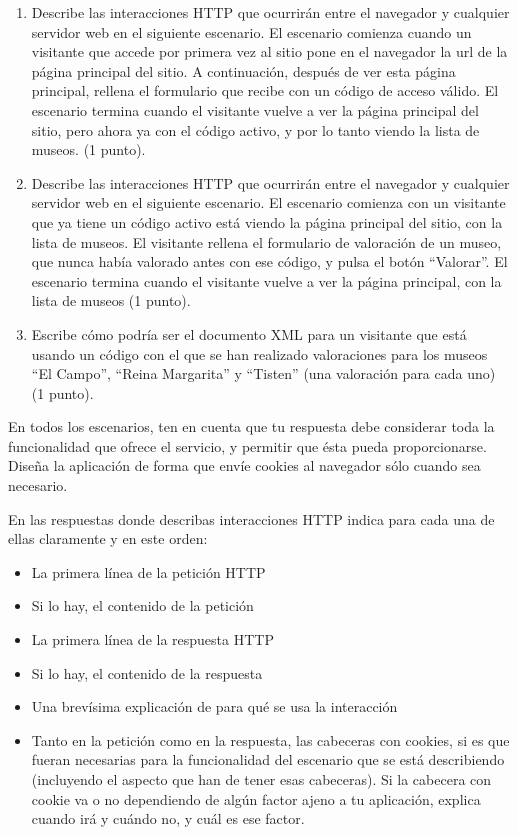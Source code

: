 {\begin{enumerate}
\item Describe las interacciones HTTP que ocurrirán entre el navegador y cualquier servidor web en el siguiente escenario. El escenario comienza cuando un visitante que accede por primera vez al sitio pone en el navegador la url de la página principal del sitio. A continuación, después de ver esta página principal, rellena el formulario que recibe con un código de acceso válido. El escenario termina cuando el visitante vuelve a ver la página principal del sitio, pero ahora ya con el código activo, y por lo tanto viendo la lista de museos. (1 punto).

\item Describe las interacciones HTTP que ocurrirán entre el navegador y cualquier servidor web en el siguiente escenario. El escenario comienza con un visitante que ya tiene un código activo está viendo la página principal del sitio, con la lista de museos. El visitante rellena el formulario de valoración de un museo, que nunca había valorado antes con ese código, y pulsa el botón ``Valorar''. El escenario termina cuando el visitante vuelve a ver la página principal, con la lista de museos (1 punto).

\item Escribe cómo podría ser el documento XML para un visitante que está usando un código con el que se han realizado valoraciones para los museos ``El Campo'', ``Reina Margarita'' y ``Tisten'' (una valoración para cada uno) (1 punto).
\end{enumerate}

En todos los escenarios, ten en cuenta que tu respuesta debe considerar toda la funcionalidad que ofrece el servicio, y permitir que ésta pueda proporcionarse. Diseña la aplicación de forma que envíe cookies al navegador sólo cuando sea necesario.

En las respuestas donde describas interacciones HTTP indica para cada una de ellas claramente y en este orden:
  \begin{itemize}
  \item La primera línea de la petición HTTP
  \item Si lo hay, el contenido de la petición
  \item La primera línea de la respuesta HTTP
  \item Si lo hay, el contenido de la respuesta
  \item Una brevísima explicación de para qué se usa la interacción
  \item Tanto en la petición como en la respuesta, las cabeceras con cookies, si es que fueran necesarias para la funcionalidad del escenario que se está describiendo (incluyendo el aspecto que han de tener esas cabeceras). Si la cabecera con cookie va o no dependiendo de algún factor ajeno a tu aplicación, explica cuando irá y cuándo no, y cuál es ese factor.
  \end{itemize}

}
